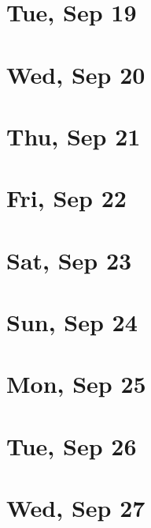 	\section{Tue, Sep 19}
		
		
	\section{Wed, Sep 20}
		
		
	\section{Thu, Sep 21}
		
		
	\section{Fri, Sep 22}
		
		
	\section{Sat, Sep 23}
		
		
	\section{Sun, Sep 24}
		
		
	\section{Mon, Sep 25}
		
		
	\section{Tue, Sep 26}
		
		
	\section{Wed, Sep 27}
		
		
